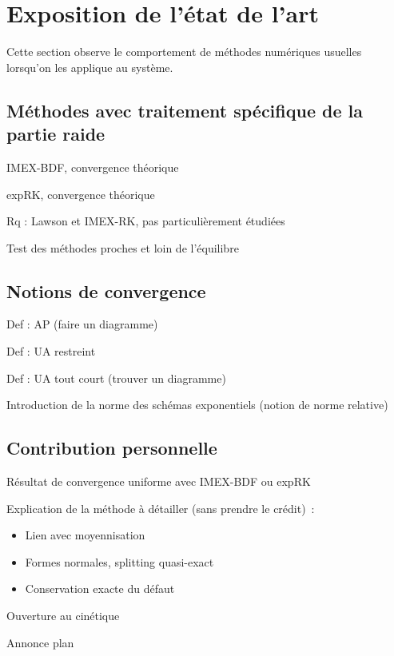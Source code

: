 \section*{Exposition de l'état de l'art}

Cette section observe le comportement de méthodes numériques usuelles lorsqu'on les applique au système.

\subsection*{Méthodes avec traitement spécifique de la partie raide}

IMEX-BDF, convergence théorique

expRK, convergence théorique

Rq : Lawson et IMEX-RK, pas particulièrement étudiées

Test des méthodes proches et loin de l'équilibre

\subsection*{Notions de convergence}

Def : AP (faire un diagramme)

Def : UA restreint

Def : UA tout court (trouver un diagramme)

Introduction de la norme des schémas exponentiels
(notion de norme relative)

\subsection*{Contribution personnelle}

Résultat de convergence uniforme avec IMEX-BDF ou expRK

Explication de la méthode à détailler (sans prendre le crédit)~:
\begin{itemize}
    \item Lien avec moyennisation
    \item Formes normales, splitting quasi-exact
    \item Conservation exacte du défaut
\end{itemize}

Ouverture au cinétique

Annonce plan